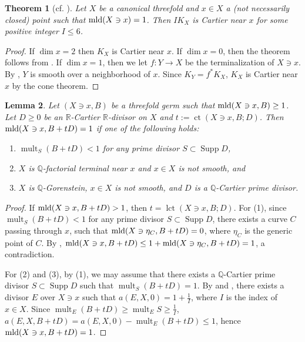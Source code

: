 \documentclass[11pt]{amsart}
\numberwithin{equation}{section}
\newcommand{\Qq}{\mathbb{Q}}
\newcommand{\Rr}{\mathbb{R}}
\newcommand{\mld}{{\rm{mld}}}
\newcommand{\lct}{\operatorname{lct}}
\newcommand{\ct}{\operatorname{ct}}
\newcommand{\Supp}{\operatorname{Supp}}
\newcommand{\mult}{\operatorname{mult}}
\newtheorem{thm}{Theorem}[section]
\newtheorem{lem}[thm]{Lemma}
\theoremstyle{definition}
\theoremstyle{definition}
\begin{document}
\begin{thm}[cf. {\cite[Theorem 1.1]{Kaw15a}}]\label{thm: canonical index}
Let $X$ be a canonical threefold and $x\in X$ a (not necessarily closed) point such that $\mld(X\ni x)=1$. Then $IK_X$ is Cartier near $x$ for some positive integer $I\leq 6$.
\end{thm}
\begin{proof}
If $\dim x=2$ then $K_X$ is Cartier near $x$. If $\dim x=0$, then the theorem follows from \cite[Theorem 1.1]{Kaw15a}. If $\dim x=1$, then we let $f: Y\rightarrow X$ be the terminalization of $X\ni x$. By \cite[Theorem 4.5]{KM98}, $Y$ is smooth over a neighborhood of $x$. Since $K_Y=f^*K_X$, $K_X$ is Cartier near $x$ by the cone theorem.
\end{proof}


\begin{lem}\label{lem: canonical threshold attain mld=1}
Let $(X\ni x, B)$ be a threefold germ such that $\mld(X\ni x, B)\geq 1$. Let $D\ge0$ be an $\Rr$-Cartier $\Rr$-divisor on $X$ and $t:=\ct(X\ni x, B;D)$. Then $\mld(X\ni x, B+tD)=1$ if one of the following holds:
\begin{enumerate}
    \item $\mult_S (B+tD)<1$ for any prime divisor $S\subset \Supp D$,
    \item $X$ is $\Qq$-factorial terminal near $x$ and $x\in X$ is not smooth, and
    \item $X$ is $\Qq$-Gorenstein, $x\in X$ is not smooth, and $D$ is a $\Qq$-Cartier prime divisor.
\end{enumerate}
\end{lem}

\begin{proof}
If $\mld(X\ni x, B+tD)>1$, then $t=\lct(X\ni x, B;D)$. For (1), since $\mult_S (B+tD)<1$ for any prime divisor $S\subset \Supp D$, there exists a curve $C$ passing through $x$, such that $\mld(X\ni \eta_C, B+tD)=0$, where $\eta_C$ is the generic point of $C$. By \cite[Theorem~0.1]{Amb99}, $\mld(X\ni x, B+tD)\leq 1+\mld(X\ni \eta_C, B+tD)=1$, a contradiction.

For (2) and (3), by (1), we may assume that there exists a $\Qq$-Cartier prime divisor $S\subset \Supp D$ such that $\mult_S (B+tD)=1$. By \cite[Appendix, Theorem]{Sho92} and \cite[Theorem 0.1]{Mar96}, there exists a divisor $E$ over $X\ni x$ such that $a(E,X,0)=1+\frac{1}{I}$, where $I$ is the index of $x\in X$. Since $\mult_E (B+tD)\geq \mult_E S\geq \frac{1}{I}$, $a(E,X,B+tD)=a(E,X,0)-\mult_E(B+tD)\leq 1$, hence $\mld(X\ni x, B+tD)=1$.
\end{proof}
\end{document}
